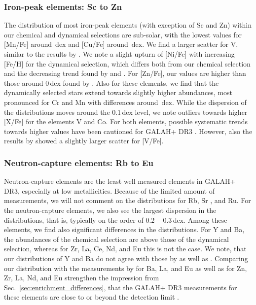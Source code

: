 \documentclass[fleqn,usenatbib]{mnras}
\newcommand{\dex}{\,\mathrm{dex}}	%
\begin{document}
\subsubsection{Iron-peak elements: Sc to Zn} \label{sec:chronochemodynamics_ironpeak}

The distribution of most iron-peak elements (with exception of Sc and Zn) within our chemical and dynamical selections are sub-solar, with the lowest values for [Mn/Fe] around $\dex$ and [Cu/Fe] around $\dex$. We find a larger scatter for V, similar to the results by \citep{Hawkins2015}. We note a slight upturn of [Ni/Fe] with increasing [Fe/H] for the dynamical selection, which differs both from our chemical selection and the decreasing trend found by \citet{Nissen2010} and \citet{Hawkins2015}. For [Zn/Fe], our values are higher than those around $0\dex$ found by \citet{Nissen2011}. Also for these elements, we find that the dynamically selected stars extend towards slightly higher abundances, most pronounced for Cr and Mn with differences around $\dex$. While the dispersion of the distributions moves around the $0.1\dex$ level, we note outliers towards higher [X/Fe] for the elements V and Co. For both elements, possible systematic trends towards higher values have been cautioned for GALAH+ DR3 \citep{Buder2021}. However, also the results by \citet{Hawkins2015} showed a slightly larger scatter for [V/Fe].

\subsubsection{Neutron-capture elements: Rb to Eu}

Neutron-capture elements are the least well measured elements in GALAH+ DR3, especially at low metallicities. Because of the limited amount of measurements, we will not comment on the distributions for Rb, Sr \citep[see however][]{Aguado2021}, and Ru.
For the neutron-capture elements, we also see the largest dispersion in the distributions, that is, typically on the order of $0.2-0.3\dex$. Among these elements, we find also significant differences in the distributions. For Y and Ba, the abundances of the chemical selection are above those of the dynamical selection, whereas for Zr, La, Ce, Nd, and Eu this is not the case. We note, that our distributions of Y and Ba do not agree with those by \citet{Nissen2011} as well as \citet{Aguado2021}. Comparing our distribution with the measurements by \citet{Venn2004} for Ba, La, and Eu as well as \citet{Fishlock2017} for Zn, Zr, La, Nd, and Eu strengthen the impression from Sec.~\ref{sec:enrichment_differences}, that the GALAH+ DR3 measurements for these elements are close to or beyond the detection limit \citep[for Eu see also][]{Matsuno2021, Aguado2021}.
\end{document}
